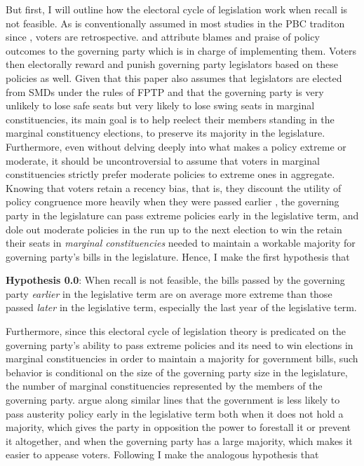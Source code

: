 \documentclass{article}
\begin{document}
		But first, I will outline how the electoral cycle of legislation work
		when recall is not feasible.
		As is conventionally assumed in
		most studies in the PBC traditon since 
		\citeauthor{nordhausPoliticalBusinessCycle1975}
		\autocite*{nordhausPoliticalBusinessCycle1975},
		voters are retrospective.
		and
		attribute blames and praise of policy outcomes
		to the governing party which is
		in charge of implementing them.
		Voters then electorally reward and punish governing party legislators
		based on these policies as well.
		Given that this paper also assumes that
		legislators are elected from SMDs under the rules of FPTP
		and that the governing party is very unlikely to lose safe seats
		but very likely to lose swing seats in marginal constituencies,
		its main goal is to help reelect their members
		standing in the marginal constituency elections,
		to preserve its majority in the legislature.
		Furthermore,
		even without delving deeply into what makes a policy
		extreme or moderate,
		it should be uncontroversial to assume that
		voters in marginal constituencies
		strictly prefer moderate policies to extreme ones
		in aggregate.
		Knowing
		that voters
		retain a recency bias,
		that is,
		they
		discount the utility of policy congruence
		more heavily
		when they
		were passed earlier
		\autocite{healySubstitutingEndWhole2014,
			stroblElectoralCyclesGovernment2021},
		the governing party in the legislature
		can pass extreme policies early in the legislative term,
		and dole out moderate policies in the run up to the next election
		to win the retain their seats in \textit{marginal constituencies}
		needed to maintain a workable majority for governing party's bills
		in the legislature.
		Hence,
		I make the first hypothesis that
		
		\textbf{Hypothesis 0.0}: When recall is not feasible,
		the bills passed by the governing party
		\textit{earlier} in the legislative term are on average  
		more extreme than those passed \textit{later} in the legislative term,
		especially the last year of the legislative term.
		
		Furthermore,
		since
		this electoral cycle of legislation theory is predicated on
		the governing party's ability to pass extreme policies
		and its need to win elections
		in marginal constituencies
		in order to maintain a majority for government bills,
		such behavior is conditional on
		the size of the governing party size in the legislature,
		the number of marginal constituencies
		represented by the members of the governing party.
		\citeauthor{stroblElectoralCyclesGovernment2021}
		\autocite*{stroblElectoralCyclesGovernment2021}
		argue along similar lines that the government is less likely to pass austerity policy
		early in the legislative term
		both when it does not hold a majority,
		which gives the party in opposition the
		power to forestall it or prevent it altogether,
		and when the governing party has a large majority,
		which makes it easier to appease voters.
		Following
		I make the analogous hypothesis that
		
\end{document}
